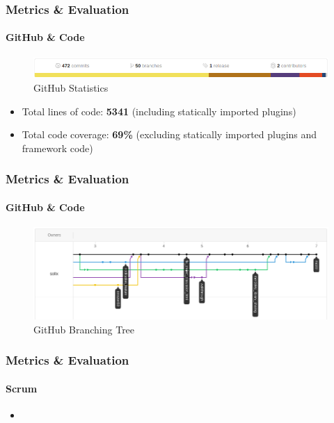 \documentclass{beamer}
\begin{document}
\begin{frame}
\frametitle{Metrics \& Evaluation}
\framesubtitle{GitHub \& Code}
	\begin{figure}
		\includegraphics[scale=0.3]{./images/github_stats.png}
		\caption{GitHub Statistics}
	\end{figure}
	\begin{itemize}
		\item Total lines of code: \textbf{5341} (including statically imported plugins)
		\item Total code coverage: \textbf{69\%} (excluding statically imported plugins and framework code)
	\end{itemize}
\end{frame}

\begin{frame}
\frametitle{Metrics \& Evaluation}
\framesubtitle{GitHub \& Code}
	\begin{figure}
		\includegraphics[scale=0.3]{./images/github_tree.png}
		\caption{GitHub Branching Tree}
	\end{figure}
\end{frame}

\begin{frame}
\frametitle{Metrics \& Evaluation}
\framesubtitle{Scrum}
	\begin{itemize}
	 \item 
	\end{itemize}
\end{frame}
\end{document}
